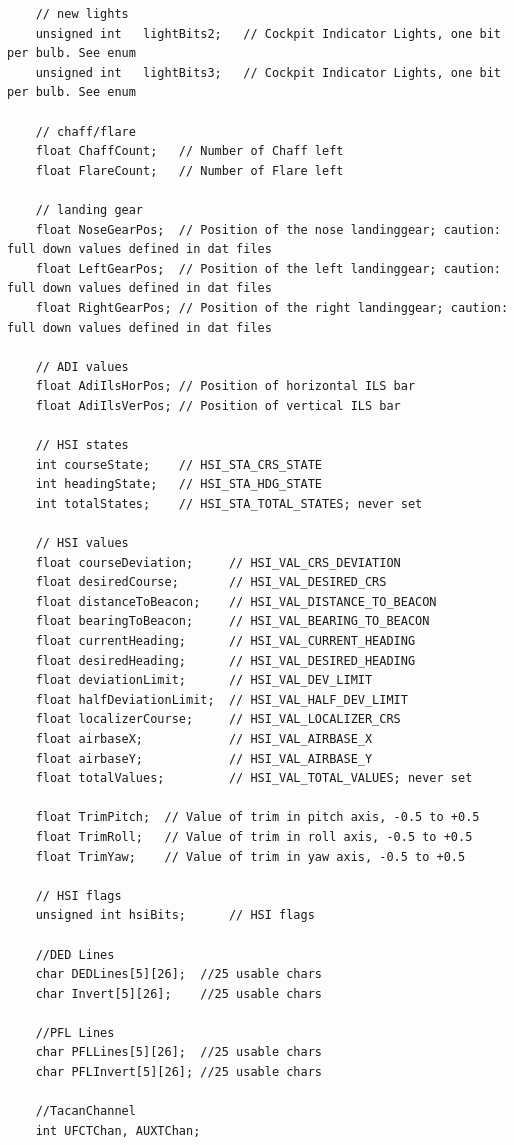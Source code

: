 \documentclass[11pt,letterpaper,titlepage]{article}
\begin{document}
\begin{landscape}
\begin{lstlisting}
    // new lights
    unsigned int   lightBits2;   // Cockpit Indicator Lights, one bit per bulb. See enum
    unsigned int   lightBits3;   // Cockpit Indicator Lights, one bit per bulb. See enum

    // chaff/flare
    float ChaffCount;   // Number of Chaff left
    float FlareCount;   // Number of Flare left

    // landing gear
    float NoseGearPos;  // Position of the nose landinggear; caution: full down values defined in dat files
    float LeftGearPos;  // Position of the left landinggear; caution: full down values defined in dat files
    float RightGearPos; // Position of the right landinggear; caution: full down values defined in dat files

    // ADI values
    float AdiIlsHorPos; // Position of horizontal ILS bar
    float AdiIlsVerPos; // Position of vertical ILS bar

    // HSI states
    int courseState;    // HSI_STA_CRS_STATE
    int headingState;   // HSI_STA_HDG_STATE
    int totalStates;    // HSI_STA_TOTAL_STATES; never set

    // HSI values
    float courseDeviation;     // HSI_VAL_CRS_DEVIATION
    float desiredCourse;       // HSI_VAL_DESIRED_CRS
    float distanceToBeacon;    // HSI_VAL_DISTANCE_TO_BEACON
    float bearingToBeacon;     // HSI_VAL_BEARING_TO_BEACON
    float currentHeading;      // HSI_VAL_CURRENT_HEADING
    float desiredHeading;      // HSI_VAL_DESIRED_HEADING
    float deviationLimit;      // HSI_VAL_DEV_LIMIT
    float halfDeviationLimit;  // HSI_VAL_HALF_DEV_LIMIT
    float localizerCourse;     // HSI_VAL_LOCALIZER_CRS
    float airbaseX;            // HSI_VAL_AIRBASE_X
    float airbaseY;            // HSI_VAL_AIRBASE_Y
    float totalValues;         // HSI_VAL_TOTAL_VALUES; never set

    float TrimPitch;  // Value of trim in pitch axis, -0.5 to +0.5
    float TrimRoll;   // Value of trim in roll axis, -0.5 to +0.5
    float TrimYaw;    // Value of trim in yaw axis, -0.5 to +0.5

    // HSI flags
    unsigned int hsiBits;      // HSI flags

    //DED Lines
    char DEDLines[5][26];  //25 usable chars
    char Invert[5][26];    //25 usable chars

    //PFL Lines
    char PFLLines[5][26];  //25 usable chars
    char PFLInvert[5][26]; //25 usable chars

    //TacanChannel
    int UFCTChan, AUXTChan;


\end{lstlisting}
\end{landscape}
\end{document}
